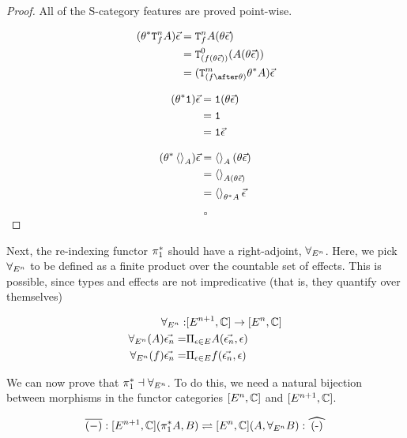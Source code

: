 \documentclass{Report}
\begin{document}
\begin{proof}
    All of the S-category features are proved point-wise.

    \begin{align}
        (\theta\star\Tn{f}{A})\ev & = \Tn{f}{A}(\theta\ev) \\
        & = \Tz{(f(\theta\ev))}{(A(\theta\ev))}\\
        & = (\Tm{(f\after\theta)}{\theta\star A})\ev\\
    \end{align}

    
\begin{align}
    (\theta^* \texttt{1})\vec{\epsilon} & = \texttt{1}(\theta\vec{\epsilon})\\
    & = \texttt{1} \\
    & = \texttt{1} \vec{\epsilon}\\
\end{align}

\begin{align}
    (\theta^*\left\langle\right\rangle_{A})\vec{\epsilon} & = \left\langle\right\rangle_{A}(\theta\vec{\epsilon})\\
    & = \left\langle\right\rangle_{A(\theta\vec{\epsilon})}\\
    & = \left\langle\right\rangle_{\theta^* A}\vec{\epsilon}
\end{align}

    $$\square$$
\end{proof}


Next, the re-indexing functor $\pi_1^*$ should have a right-adjoint, $\forall_{E^n}$. Here, we pick $\forall_{E^n}$ to be defined as a finite product over the countable set of effects. This is possible, since types and effects are not impredicative (that is, they quantify over themselves)

\begin{align}
    \forall_{E^n}:& [E^{n+1}, \mathbb{C}] \rightarrow [E^n, \mathbb{C}]\\
    \forall_{E^n}(A)\vec{\epsilon_n} =&\Pi_{\epsilon\in E}{A(\vec{\epsilon_n}, \epsilon)}
    \\ 
    \forall_{E^n}(f)\vec{\epsilon_n} =&\Pi_{\epsilon\in E}{f(\vec{\epsilon_n}, \epsilon)}
\end{align}



We can now prove that $\pi_1^* \dashv \forall_{E^n}$. To do this, we need a natural bijection between morphisms in the functor categories $[E^n, \mathbb{C}]$ and $[E^{n+1}, \mathbb{C}]$.

\begin{equation}
    \bar{(-)}: [E^{n+1}, \C](\pstar A, B) \rightleftharpoons [E^n,\C] (A, \allEn B): \widehat{(-)}
\end{equation}
\end{document}
